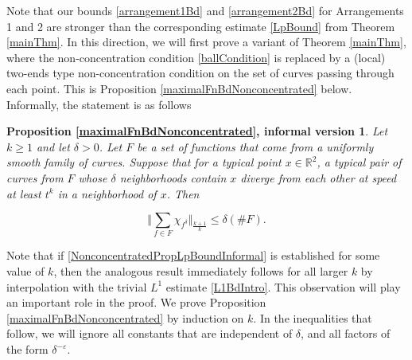 \documentclass[letterpaper, reqno,11pt]{article}
\numberwithin{equation}{section}
\newcommand{\RR}{\mathbb{R}}
\newcommand{\eps}{\varepsilon}
\numberwithin{thm}{section}
\newtheorem*{maximalFnBdNonconcentratedInformal}{Proposition \ref{maximalFnBdNonconcentrated}, informal version}
\theoremstyle{remark}
\begin{document}
Note that our bounds \eqref{arrangement1Bd} and \eqref{arrangement2Bd} for Arrangements 1 and 2 are stronger than the corresponding estimate \eqref{LpBound} from Theorem \ref{mainThm}. In this direction, we will first prove a variant of Theorem \ref{mainThm}, where the non-concentration condition \eqref{ballCondition} is replaced by a (local) two-ends type non-concentration condition on the set of curves passing through each point. This is Proposition \ref{maximalFnBdNonconcentrated} below. Informally, the statement is as follows
\begin{maximalFnBdNonconcentratedInformal}
Let $k\geq 1$ and let $\delta>0$. Let $F$ be a set of functions that come from a uniformly smooth family of curves. Suppose that for a typical point $x\in \RR^2$, a typical pair of curves from $F$ whose $\delta$ neighborhoods contain $x$ diverge from each other at speed at least $t^k$ in a neighborhood of $x$. Then

\begin{equation}\label{NonconcentratedPropLpBoundInformal}
\Big \Vert \sum_{f\in F}\chi_{f^\delta}\Big\Vert_{\frac{k+1}{k}}\leq \delta(\#F).
\end{equation}
\end{maximalFnBdNonconcentratedInformal}
Note that if \eqref{NonconcentratedPropLpBoundInformal} is established for some value of $k$, then the analogous result immediately follows for all larger $k$ by interpolation with the trivial $L^1$ estimate \eqref{L1BdIntro}. This observation will play an important role in the proof. We prove Proposition \ref{maximalFnBdNonconcentrated} by induction on $k$. In the inequalities that follow, we will ignore all constants that are independent of $\delta$, and all factors of the form $\delta^{-\eps}$.
\end{document}
